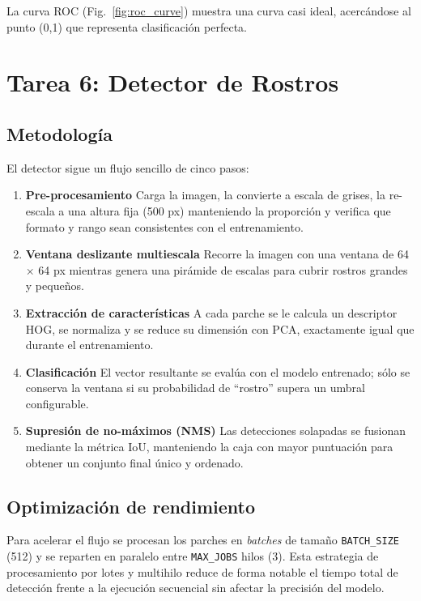 \documentclass{article}
\begin{document}
La curva ROC (Fig.~\ref{fig:roc_curve}) muestra una curva casi ideal, acercándose al punto (0,1) que representa clasificación perfecta.

\pagebreak

\section*{Tarea 6: Detector de Rostros}

\subsection*{Metodología}

El detector sigue un flujo sencillo de cinco pasos:

\begin{enumerate}
    \item \textbf{Pre-procesamiento}  
          Carga la imagen, la convierte a escala de grises, la re-escala a una altura fija (500 px) manteniendo la proporción y verifica que formato y rango sean consistentes con el entrenamiento.

    \item \textbf{Ventana deslizante multiescala}  
          Recorre la imagen con una ventana de 64 × 64 px mientras genera una pirámide de escalas para cubrir rostros grandes y pequeños.

    \item \textbf{Extracción de características}  
          A cada parche se le calcula un descriptor HOG, se normaliza y se reduce su dimensión con PCA, exactamente igual que durante el entrenamiento.

    \item \textbf{Clasificación}  
          El vector resultante se evalúa con el modelo entrenado; sólo se conserva la ventana si su probabilidad de “rostro” supera un umbral configurable.

    \item \textbf{Supresión de no-máximos (NMS)}  
          Las detecciones solapadas se fusionan mediante la métrica IoU, manteniendo la caja con mayor puntuación para obtener un conjunto final único y ordenado.
\end{enumerate}

\subsection*{Optimización de rendimiento}  
Para acelerar el flujo se procesan los parches en \emph{batches} de tamaño \texttt{BATCH\_SIZE} (512) y se reparten en paralelo entre \texttt{MAX\_JOBS} hilos (3). Esta estrategia de procesamiento por lotes y multihilo reduce de forma notable el tiempo total de detección frente a la ejecución secuencial sin afectar la precisión del modelo.
\end{document}
